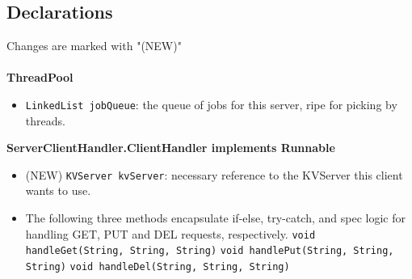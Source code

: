 \subsection{Declarations}
Changes are marked with "(NEW)" \\\\
\textbf{ThreadPool}
\begin{itemize}
\item \texttt{LinkedList jobQueue}: the queue of jobs for this server, ripe for picking by threads. 
\end{itemize}
\textbf{ServerClientHandler.ClientHandler implements Runnable}
\begin{itemize}
\item (NEW) \texttt{KVServer kvServer}: necessary reference to the KVServer this client wants to use.
\item The following three methods encapsulate if-else, try-catch, and spec logic for handling GET, PUT and DEL requests, respectively.
\subitem \texttt{void handleGet(String, String, String)}
\subitem \texttt{void handlePut(String, String, String)}
\subitem \texttt{void handleDel(String, String, String)}
\end{itemize}
